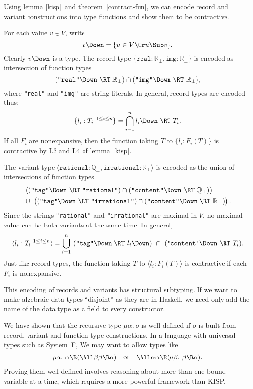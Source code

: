 \documentclass{amsart}
\theoremstyle{definition}
\begin{document}

Using lemma \ref{kisp}~and theorem~\ref{contract-fun}, we can
encode record and variant constructions into type functions and
show them to be contractive.

For each value $v\in V$, write
\[
v\Down = \{u\in V \Or u \Sub v\}.
\]
Clearly $v\Down$ is a type. The record type
$
\{\texttt{real}:\mathbb R_\bot,\texttt{img}:\mathbb R_\bot\}
$
is encoded as intersection of function types
\[
(\texttt{"real"}\Down~\RT~\mathbb R_\bot)
\cap(\texttt{"img"}\Down~\RT~\mathbb R_\bot),
\]
where \texttt{"real"} and \texttt{"img"} are string literals. In
general, record types are encoded thus:
\[
\{l_i:T_i~^{1\le i \le n}\}
=
\bigcap_{i=1}^n l_i\Down~\RT~T_i.
\]
If all $F_i$ are nonexpansive, then the function taking $T$ to
$\{l_i:F_i(T)\}$ is contractive by L3 and L4 of lemma~\ref{kisp}.

The variant type $\langle\texttt{rational}:\mathbb
Q_\bot,\texttt{irrational}:\mathbb R_\bot\rangle$ is encoded as
the union of intersections of function types
{\def\Raise{\raisebox{0pt}[2.1ex][0pt]{}}
\begin{align*}
&\left(\Raise
(\texttt{"tag"}\Down~\RT~\texttt{"rational"})
\cap
(\texttt{"content"}\Down~\RT~\mathbb Q_\bot)
\right)\\
&\cup~
\left(\Raise
(\texttt{"tag"}\Down~\RT~\texttt{"irrational"})
\cap
(\texttt{"content"}\Down~\RT~\mathbb R_\bot)
\right).
\end{align*}}%
Since the strings \texttt{"rational"} and \texttt{"irrational"}
are maximal in $V$, no maximal value can be both variants at the
same time. In general,
\[
\langle l_i:T_i~^{1\le i\le n}\rangle =
\bigcup_{i=1}^n~
(\texttt{"tag"}\Down~\RT~l_i\Down)
~\cap~
(\texttt{"content"}\Down~\RT~T_i).
\]
Just like record types, the function taking $T$ to $\langle
l_i:F_i(T)\rangle$ is contractive if each $F_i$ is nonexpansive.

This encoding of records and variants has structural subtyping.
If we want to make algebraic data types ``disjoint'' as they are
in Haskell, we need only add the name of the data type as a field
to every constructor.



We have shown that the recursive type $\mu\alpha.~\sigma$ is
well-defined if $\sigma$ is built from record, variant and
function type constructions. In a language with universal types
such as System~F, We may want to allow types like
\begin{align*}
&\mu\alpha.~\alpha\R(\All\beta\beta\R\alpha)
&\mbox{or}&
&\All\alpha\alpha\R(\mu\beta.~\beta\R\alpha).
\end{align*}
Proving them well-defined involves reasoning about more than one
bound variable at a time, which requires a more powerful
framework than KISP.
\end{document}
